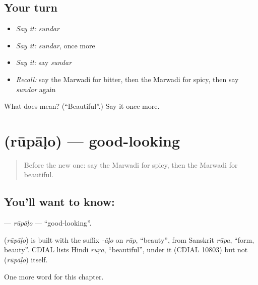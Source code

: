 \subsection*{Your turn}
\begin{itemize}
\raggedright
  \item \emph{Say it:} \emph{sundar}
  \item \emph{Say it:} \emph{sundar}, once more
  \item \emph{Say it:} say \emph{sundar}
  \item \emph{Recall:} say the Marwadi for bitter, then the Marwadi for spicy, then say \emph{sundar} again
\end{itemize}

\begin{tcolorbox}[breakable,colback=teal!4,colframe=teal!35!black,title={Before you move on}]
What does  mean? (\textquotedblleft{}Beautiful\textquotedblright{}.) Say it once more.
\end{tcolorbox}
\section[\texorpdfstring{\mw{रूपाळो} (rūpāḷo)}{रूपाळो (rūpāḷo)}]{ (rūpāḷo) — good-looking}

\label{lesson:MW-C144-rupalo}



\begin{quote}
Before the new one: say the Marwadi for spicy, then the Marwadi for beautiful.
\end{quote}

\subsection*{You'll want to know: }
\textbf{} — \emph{rūpāḷo} — \textquotedblleft{}good-looking\textquotedblright{}.

\begin{cousinweb}
\textbf{} (\emph{rūpāḷo}) is built with the suffix \emph{-āḷo} on \emph{rūp}, \textquotedblleft{}beauty\textquotedblright{}, from Sanskrit \emph{rūpa}, \textquotedblleft{}form, beauty\textquotedblright{}. CDIAL lists Hindi \emph{rūṛā}, \textquotedblleft{}beautiful\textquotedblright{}, under it (CDIAL 10803) but not \textbf{} (\emph{rūpāḷo}) itself.
\end{cousinweb}

\begin{grammarlens}[title={What you've built}]
One more word for this chapter.
\end{grammarlens}

